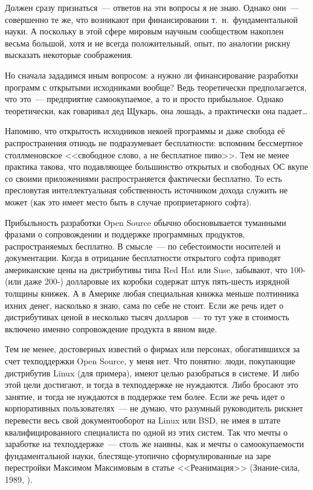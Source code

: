 Должен сразу признаться~--- ответов на эти вопросы я не знаю. Однако они~--- совершенно те же, что возникают при финансировании т.~н.~фундаментальной науки. А поскольку в этой сфере мировым научным сообществом накоплен весьма большой, хотя и не всегда положительный, опыт, по аналогии рискну высказать некоторые соображения.

Но сначала зададимся иным вопросом: а нужно ли финансирование разработки программ с открытыми исходниками вообще? Ведь теоретически предполагается, что это~--- предприятие самоокупаемое, а то и просто прибыльное. Однако теоретически, как говаривал дед Щукарь, она лошадь, а практически она падает\dots

Напомню, что открытость исходников некоей программы и даже свобода её распространения отнюдь не подразумевает бесплатности: вспомним бессмертное столлменовское <<свободное слово, а не бесплатное пиво>>. Тем не менее практика такова, что подавляющее большинство открытых и свободных ОС вкупе со своими приложениями распространяется фактически бесплатно. То есть пресловутая интеллектуальная собственность источником дохода служить не может (как это имеет место быть в случае проприетарного софта).

Прибыльность разработки Open Source обычно обосновывается туманными фразами о сопровождении и поддержке программных продуктов, распространяемых бесплатно. В смысле~--- по себестоимости носителей и документации. Когда в отрицание бесплатности открытого софта приводят американские цены на дистрибутивы типа Red Hat или Suse, забывают, что 100- (или даже 200-) долларовые их коробки содержат штук пять-шесть изрядной толщины книжек. А в Америке любая специальная книжка меньше полтинника ихних денег, насколько я знаю, сама по себе не стоит. Если же речь идет о дистрибутивах ценой в несколько тысяч долларов~--- то тут уже в стоимость включено именно сопровождение продукта в явном виде.

Тем не менее, достоверных известий о фирмах или персонах, обогатившихся за счет техподдержки Open Source, у меня нет. Что понятно: люди, покупающие дистрибутив Linux (для примера), имеют целью разобраться в системе. И либо этой цели достигают, и тогда в техподдержке не нуждаются. Либо бросают это занятие, и тогда не нуждаются в поддержке тем более. Если же речь идет о корпоративных пользователях~--- не думаю, что разумный руководитель рискнет перевести весь свой документооборот на Linux или BSD, не имея в штате квалифицированного специалиста по одной из этих систем. Так что мечты о заработке на техподдержке~--- столь же наивны, как и мечты о самоокупаемости фундаментальной науки, блестяще-утопично сформулированные на заре перестройки Максимом Максимовым в статье <<Реанимация>> (Знание-сила, 1989, ).


